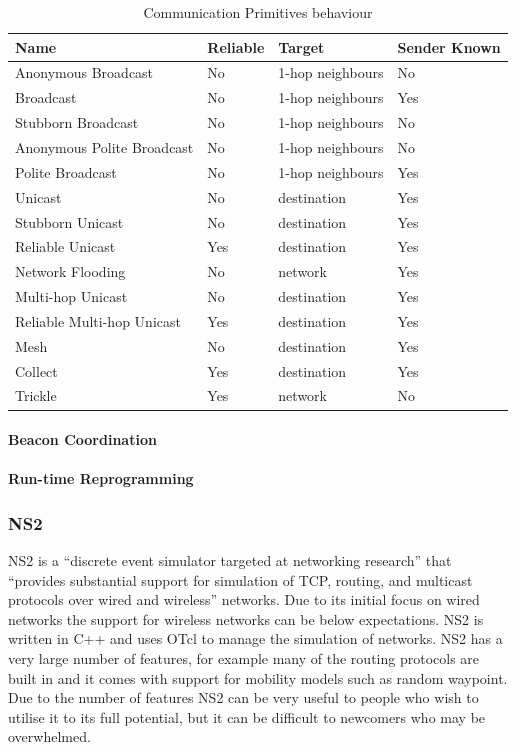 \begin{table}[H]
	\centering
	\begin{tabular}{ | l | l | l | l | }
		\hline
		Name & Reliable & Target & Sender Known\\
		\hline
		Anonymous Broadcast & No & 1-hop neighbours & No\\
		Broadcast & No & 1-hop neighbours & Yes\\
		Stubborn Broadcast & No & 1-hop neighbours & No\\
		Anonymous Polite Broadcast & No & 1-hop neighbours & No\\
		Polite Broadcast & No & 1-hop neighbours & Yes\\
		Unicast & No & destination & Yes\\
		Stubborn Unicast & No & destination & Yes\\
		Reliable Unicast & Yes & destination & Yes\\
		Network Flooding & No & network & Yes\\
		Multi-hop Unicast & No & destination & Yes\\
		Reliable Multi-hop Unicast & Yes & destination & Yes\\
		\hline
		\hline
		Mesh & No & destination & Yes \\
		Collect & Yes & destination & Yes \\
		Trickle & Yes & network & No \\
		\hline
	\end{tabular}
	\caption{Communication Primitives behaviour}
\end{table}

\paragraph{Beacon Coordination}
\cite{Dunkels:2011:ALB:1966251.1966270} %

\paragraph{Run-time Reprogramming}
\cite{Dunkels:2006:RDL:1182807.1182810} %

\subsubsection*{NS2}

NS2 is a ``discrete event simulator targeted at networking research'' \cite{NS2} that ``provides substantial support for simulation of TCP, routing, and multicast protocols over wired and wireless'' networks. Due to its initial focus on wired networks the support for wireless networks can be below expectations. NS2 is written in C++ and uses OTcl to manage the simulation of networks. NS2 has a very large number of features, for example many of the routing protocols are built in and it comes with support for mobility models such as random waypoint. Due to the number of features NS2 can be very useful to people who wish to utilise it to its full potential, but it can be difficult to newcomers who may be overwhelmed.

